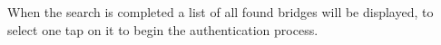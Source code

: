 When the search is completed a list of all found bridges will be
displayed, to select one tap on it to begin the authentication process.

\begin{figure}[H]
  \centering
  \qquad

\end{figure}
